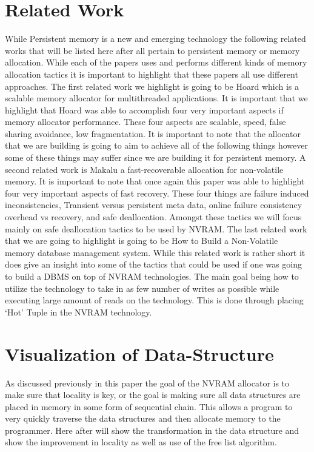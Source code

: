 \documentclass[conference]{IEEEtran}
\begin{document}
\section{Related Work}
While Persistent memory is a new and emerging technology the following related works that will be listed here after all pertain to persistent memory or memory allocation. While each of the papers uses and performs different kinds of memory allocation tactics it is important to highlight that these papers all use different approaches. The first related work we highlight is going to be Hoard which is a scalable memory allocator for multithreaded applications. It is important that we highlight that Hoard was able to accomplish four very important aspects if memory allocator performance. These four aspects are scalable, speed, false sharing avoidance, low fragmentation. It is important to note that the allocator that we are building is going to aim to achieve all of the following things however some of these things may suffer since we are building it for persistent memory. A second related work is Makalu a fast-recoverable allocation for non-volatile memory. It is important to note that once again this paper was able to highlight four very important aspects of fast recovery. These four things are failure induced inconsistencies, Transient versus persistent meta data, online failure consistency overhead vs recovery, and safe deallocation. Amongst these tactics we will focus mainly on safe deallocation tactics to be used by NVRAM. The last related work that we are going to highlight is going to be How to Build a Non-Volatile memory database management system. While this related work is rather short it does give an insight into some of the tactics that could be used if one was going to build a DBMS on top of NVRAM technologies. The main goal being how to utilize the technology to take in as few number of writes as possible while executing large amount of reads on the technology. This is done through placing ‘Hot’ Tuple in the NVRAM technology. 
\section{Visualization of Data-Structure} 
As discussed previously in this paper the goal of the NVRAM allocator is to make sure that locality is key, or the goal is making sure all data structures are placed in memory in some form of sequential chain. This allows a program to very quickly traverse the data structures and then allocate memory to the programmer. Here after will show the transformation in the data structure and show the improvement in locality as well as use of the free list algorithm. 
\end{document}
